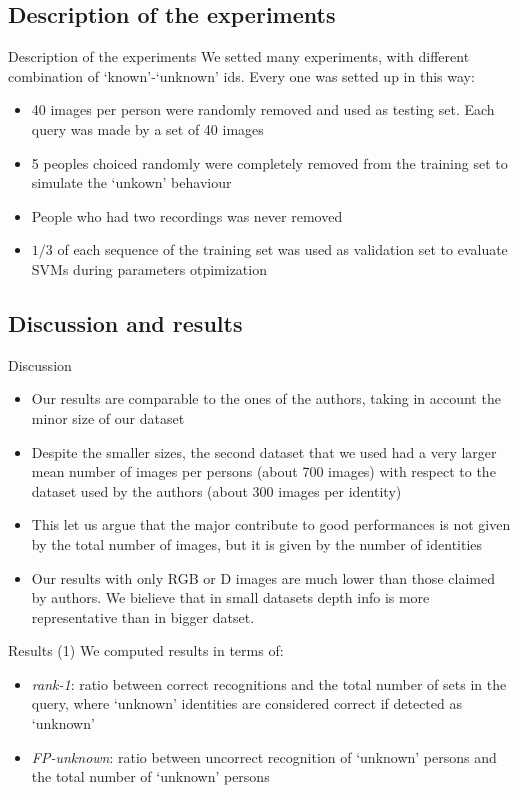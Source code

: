 \documentclass{beamer}
\begin{document}
\subsection{Description of the experiments}
\begin{frame}{Description of the experiments}
	We setted many experiments, with different combination of
	`known'-`unknown' ids. Every one was setted up in this way:
	\begin{itemize}
		\item 40 images per person were randomly removed and used as
			testing set. Each query was made by a set of 40 images
		\item 5 peoples choiced randomly were completely removed from
			the training set to simulate the `unkown' behaviour
		\item People who had two recordings was never removed
		\item $1/3$ of each sequence of the training set was used as
			validation set to evaluate SVMs during parameters
			otpimization
	\end{itemize}
\end{frame}

\subsection{Discussion and results}
\begin{frame}{Discussion}
	\begin{itemize}
		\item Our results are comparable to the ones of the authors,
			taking in account the minor size of our dataset
		\item Despite the smaller sizes, the second dataset that we
			used had a very larger mean number of images per
			persons (about 700 images) with respect to the dataset
			used by the authors (about 300 images per identity)
		\item This let us argue that the major contribute to good
			performances is not given by the total number of images,
			but it is given by the number of identities
		\item Our results with only RGB or D images are much lower than
			those claimed by authors. We bielieve that in small
			datasets depth info is more representative than in
			bigger datset.
	\end{itemize}
\end{frame}

\begin{frame}{Results (1)}
	We computed results in terms of:
	\begin{itemize}
		\item \textit{rank-1}: ratio between correct recognitions and
			the total number of sets in the query, where `unknown'
			identities are considered correct if detected as
			`unknown'
		\item \textit{FP-unknown}: ratio between uncorrect recognition
			of `unknown' persons and the total number of `unknown'
			persons
	\end{itemize}
\end{frame}
\end{document}
